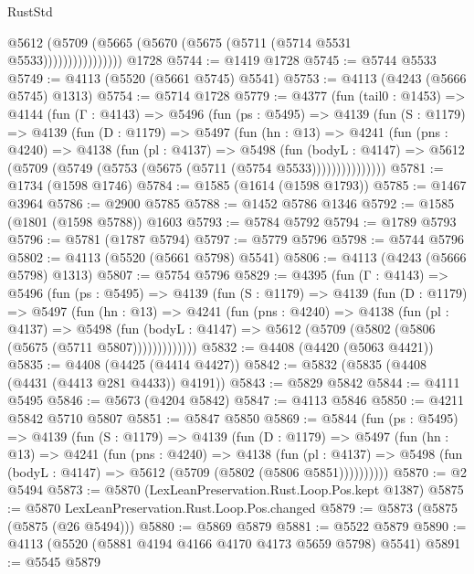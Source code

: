 \begin{lexlean}{RustStd}
\begin{coremodule}
                      @5612 (@5709 (@5665 (@5670 (@5675 (@5711 (@5714 @5531 @5533))))))))))))))))
    @1728
@5744 := @1419 @1728
@5745 := @5744 @5533
@5749 := @4113 (@5520 (@5661 @5745) @5541)
@5753 := @4113 (@4243 (@5666 @5745) @1313)
@5754 := @5714 @1728
@5779 := @4377
    (fun (tail0 : @1453) =>
    @4144
      (fun (Γ : @4143) =>
      @5496
        (fun (ps : @5495) =>
        @4139
          (fun (S : @1179) =>
          @4139
            (fun (D : @1179) =>
            @5497
              (fun (hn : @13) =>
              @4241
                (fun (pns : @4240) =>
                @4138
                  (fun (pl : @4137) =>
                  @5498
                    (fun (bodyL : @4147) =>
                    @5612 (@5709 (@5749 (@5753 (@5675 (@5711 (@5754 @5533)))))))))))))))
@5781 := @1734 (@1598 @1746)
@5784 := @1585 (@1614 (@1598 @1793))
@5785 := @1467 @3964
@5786 := @2900 @5785
@5788 := @1452 @5786 @1346
@5792 := @1585 (@1801 (@1598 @5788)) @1603
@5793 := @5784 @5792
@5794 := @1789 @5793
@5796 := @5781 (@1787 @5794)
@5797 := @5779 @5796
@5798 := @5744 @5796
@5802 := @4113 (@5520 (@5661 @5798) @5541)
@5806 := @4113 (@4243 (@5666 @5798) @1313)
@5807 := @5754 @5796
@5829 := @4395
    (fun (Γ : @4143) =>
    @5496
      (fun (ps : @5495) =>
      @4139
        (fun (S : @1179) =>
        @4139
          (fun (D : @1179) =>
          @5497
            (fun (hn : @13) =>
            @4241
              (fun (pns : @4240) =>
              @4138
                (fun (pl : @4137) =>
                @5498
                  (fun (bodyL : @4147) =>
                  @5612 (@5709 (@5802 (@5806 (@5675 (@5711 @5807)))))))))))))
@5832 := @4408 (@4420 (@5063 @4421))
@5835 := @4408 (@4425 (@4414 @4427))
@5842 := @5832 (@5835 (@4408 (@4431 (@4413 @281 @4433)) @4191))
@5843 := @5829 @5842
@5844 := @4111 @5495
@5846 := @5673 (@4204 @5842)
@5847 := @4113 @5846
@5850 := @4211 @5842 @5710 @5807
@5851 := @5847 @5850
@5869 := @5844
    (fun (ps : @5495) =>
    @4139
      (fun (S : @1179) =>
      @4139
        (fun (D : @1179) =>
        @5497
          (fun (hn : @13) =>
          @4241
            (fun (pns : @4240) =>
            @4138
              (fun (pl : @4137) =>
              @5498 (fun (bodyL : @4147) => @5612 (@5709 (@5802 (@5806 @5851))))))))))
@5870 := @2 @5494
@5873 := @5870 (LexLeanPreservation.Rust.Loop.Pos.kept @1387)
@5875 := @5870 LexLeanPreservation.Rust.Loop.Pos.changed
@5879 := @5873 (@5875 (@5875 (@26 @5494)))
@5880 := @5869 @5879
@5881 := @5522 @5879
@5890 := @4113 (@5520 (@5881 @4194 @4166 @4170 @4173 @5659 @5798) @5541)
@5891 := @5545 @5879

\end{coremodule}
\end{lexlean}
